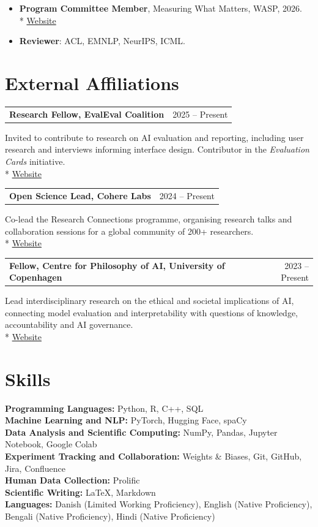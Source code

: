 \documentclass[11pt,letterpaper]{article}
\makeatletter
\newcommand{\entry}[2]{%
  \par\addvspace{7pt}\Needspace{5\baselineskip}%
  \noindent\begin{tabularx}{\linewidth}{@{}Xr@{}}%
    \textbf{#1} & {\small\sffamily\color{muted}#2}%
  \end{tabularx}\par\nobreak\vspace{-3pt}%
}
\makeatother
\begin{document}
\begin{itemize}[label={}, leftmargin=0pt, labelsep=0pt]
  \item \textbf{Program Committee Member},
    Measuring What Matters, WASP, 2026.\\*
    {\footnotesize\sffamily\href{https://wasp-sweden.org/event/measuring-what-matters/}{Website}}
  \item \textbf{Reviewer}: ACL, EMNLP, NeurIPS, ICML.
\end{itemize}

\clearpage
\section{External Affiliations}

\entry{Research Fellow, EvalEval Coalition}
{2025 -- Present}
Invited to contribute to research on AI evaluation and reporting,
including user research and interviews informing interface design.
Contributor in the \textit{Evaluation Cards} initiative.\\*
{\footnotesize\sffamily\href{https://evalevalai.com/}{Website}}

\entry{Open Science Lead,
Cohere Labs}
{2024 -- Present}
Co-lead the Research Connections programme, organising research talks
and collaboration sessions for a global community of 200+ researchers.\\*
{\footnotesize\sffamily\href{https://cohere.com/research/open-science}{Website}}

\entry{Fellow,
Centre for Philosophy of AI,
University of Copenhagen}
{2023 -- Present}
Lead interdisciplinary research on the ethical and societal implications
of AI, connecting model evaluation and interpretability with questions
of knowledge, accountability and AI governance.\\*
{\footnotesize\sffamily\href{https://cpai.ku.dk/}{Website}}

\section{Skills}

\noindent
\textbf{Programming Languages:}
Python, R, C++, SQL\\[3pt]
\textbf{Machine Learning and NLP:}
PyTorch, Hugging Face, spaCy\\[3pt]
\textbf{Data Analysis and Scientific Computing:}
NumPy, Pandas, Jupyter Notebook, Google Colab\\[3pt]
\textbf{Experiment Tracking and Collaboration:}
Weights \& Biases, Git, GitHub, Jira, Confluence\\[3pt]
\textbf{Human Data Collection:}
Prolific\\[3pt]
\textbf{Scientific Writing:}
\LaTeX, Markdown\\[3pt]
\textbf{Languages:}
Danish (Limited Working Proficiency),
English (Native Proficiency), 
Bengali (Native Proficiency),
Hindi (Native Proficiency)
\end{document}
